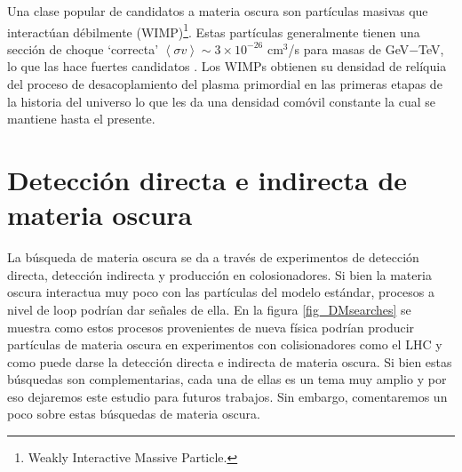 Una clase popular de candidatos a materia oscura son partículas masivas que interactúan débilmente (WIMP)\footnote{Weakly Interactive Massive Particle.}. Estas partículas generalmente tienen una sección de choque `correcta' $\left< \sigma v\right> \sim 3 \times 10^{-26}$ cm$^3$/s para masas de GeV$-$TeV, lo que las hace fuertes candidatos \cite{profumo2017introduction}. Los WIMPs obtienen su densidad de relíquia del proceso de desacoplamiento del plasma primordial en las primeras etapas de la historia del universo lo que les da una densidad comóvil constante la cual se mantiene hasta el presente.

\section[\hspace{-0.14in}Detección directa e indirecta de materia oscura]{Detección directa e indirecta de materia oscura}

La búsqueda de materia oscura se da a través de experimentos de detección directa, detección indirecta y producción en colosionadores. Si bien la materia oscura interactua muy poco con las partículas del modelo estándar, procesos a nivel de loop podrían dar señales de ella. En la figura \ref{fig_DMsearches} se muestra como estos procesos provenientes de nueva física podrían producir partículas de materia oscura en experimentos con colisionadores como el LHC y como puede darse la detección directa e indirecta de materia oscura. Si bien estas búsquedas son complementarias, cada una de ellas es un tema muy amplio y por eso dejaremos este estudio para futuros trabajos. Sin embargo, comentaremos un poco sobre estas búsquedas de materia oscura.


